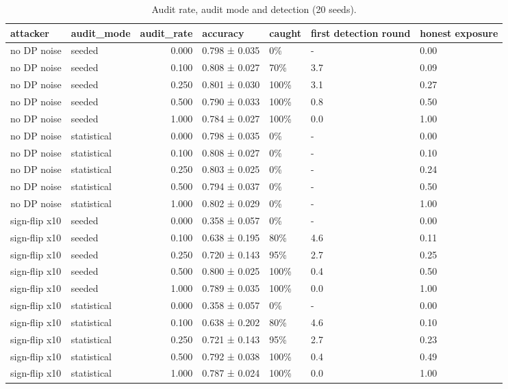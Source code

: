 \begin{table}
\caption{Audit rate, audit mode and detection (20 seeds).}
\label{tab:T15_audit_tradeoff}
\begin{tabular}{llrllll}
\toprule
attacker & audit\_mode & audit\_rate & accuracy & caught & first detection round & honest exposure \\
\midrule
no DP noise & seeded & 0.000 & 0.798 ± 0.035 & 0\% & - & 0.00 \\
no DP noise & seeded & 0.100 & 0.808 ± 0.027 & 70\% & 3.7 & 0.09 \\
no DP noise & seeded & 0.250 & 0.801 ± 0.030 & 100\% & 3.1 & 0.27 \\
no DP noise & seeded & 0.500 & 0.790 ± 0.033 & 100\% & 0.8 & 0.50 \\
no DP noise & seeded & 1.000 & 0.784 ± 0.027 & 100\% & 0.0 & 1.00 \\
no DP noise & statistical & 0.000 & 0.798 ± 0.035 & 0\% & - & 0.00 \\
no DP noise & statistical & 0.100 & 0.808 ± 0.027 & 0\% & - & 0.10 \\
no DP noise & statistical & 0.250 & 0.803 ± 0.025 & 0\% & - & 0.24 \\
no DP noise & statistical & 0.500 & 0.794 ± 0.037 & 0\% & - & 0.50 \\
no DP noise & statistical & 1.000 & 0.802 ± 0.029 & 0\% & - & 1.00 \\
sign-flip x10 & seeded & 0.000 & 0.358 ± 0.057 & 0\% & - & 0.00 \\
sign-flip x10 & seeded & 0.100 & 0.638 ± 0.195 & 80\% & 4.6 & 0.11 \\
sign-flip x10 & seeded & 0.250 & 0.720 ± 0.143 & 95\% & 2.7 & 0.25 \\
sign-flip x10 & seeded & 0.500 & 0.800 ± 0.025 & 100\% & 0.4 & 0.50 \\
sign-flip x10 & seeded & 1.000 & 0.789 ± 0.035 & 100\% & 0.0 & 1.00 \\
sign-flip x10 & statistical & 0.000 & 0.358 ± 0.057 & 0\% & - & 0.00 \\
sign-flip x10 & statistical & 0.100 & 0.638 ± 0.202 & 80\% & 4.6 & 0.10 \\
sign-flip x10 & statistical & 0.250 & 0.721 ± 0.143 & 95\% & 2.7 & 0.23 \\
sign-flip x10 & statistical & 0.500 & 0.792 ± 0.038 & 100\% & 0.4 & 0.49 \\
sign-flip x10 & statistical & 1.000 & 0.787 ± 0.024 & 100\% & 0.0 & 1.00 \\
\bottomrule
\end{tabular}
\end{table}
